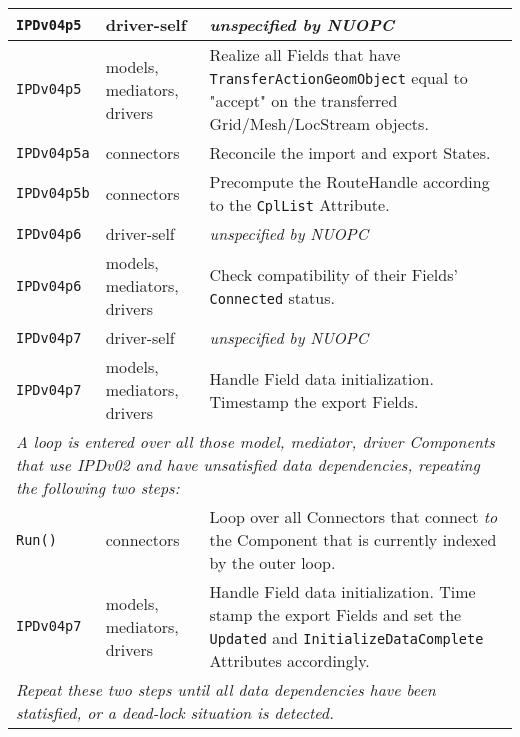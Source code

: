 \begin{longtable}[h]{|p{35mm}|p{4cm}|p{6cm}|}
     {\tt IPDv04p5}   & driver-self                 & {\em unspecified by NUOPC}\\ \hline
     {\tt IPDv04p5}   & models, mediators, drivers  & Realize all Fields that have {\tt TransferActionGeomObject} equal to "accept" on the transferred Grid/Mesh/LocStream objects.\\ \hline
     {\tt IPDv04p5a}  & connectors                  & Reconcile the import and export States.\\ \hline
     {\tt IPDv04p5b}  & connectors                  & Precompute the RouteHandle according to the {\tt CplList} Attribute.\\ \hline
     {\tt IPDv04p6}   & driver-self                 & {\em unspecified by NUOPC}\\ \hline
     {\tt IPDv04p6}   & models, mediators, drivers  & Check compatibility of their Fields' {\tt Connected} status.\\ \hline
     {\tt IPDv04p7}   & driver-self                 & {\em unspecified by NUOPC}\\ \hline
     {\tt IPDv04p7}   & models, mediators, drivers  & Handle Field data initialization. Timestamp the export Fields.\\ \hline
     \multicolumn{3}{|p{13.5cm}|}{\it A loop is entered over all those model, mediator, driver Components that use IPDv02 and have
     unsatisfied data dependencies, repeating the following two steps:}\\ \hline
     {\tt Run()}      & connectors                  & Loop over all Connectors that connect {\it to} the Component that is currently indexed by the outer loop.\\ \hline
     {\tt IPDv04p7}   & models, mediators, drivers  & Handle Field data initialization. Time stamp the export Fields and set the {\tt Updated} and {\tt InitializeDataComplete} Attributes accordingly.\\ \hline
     \multicolumn{3}{|p{13.5cm}|}{\it Repeat these two steps until all data
     dependencies have been statisfied, or a dead-lock situation is detected.}\\ 
     \hline\hline
\end{longtable}


